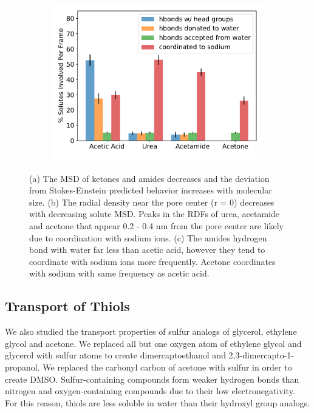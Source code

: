 \documentclass[journal=jpcbfk,manuscript=article]{achemso}
\begin{document}
\begin{figure}[!htb]
\begin{subfigure}{0.325\textwidth}
  \includegraphics[width=\textwidth]{ketone_hbonds.pdf}
  \caption{}\label{fig:ketone_hbonds}
  \end{subfigure}
  \caption{(a) The MSD of ketones and amides decreases and the deviation from
  Stokes-Einstein predicted behavior increases with molecular size.
  (b) The radial density near the pore center (r = 0) decreases with decreasing
  solute MSD. Peaks in the RDFs of urea, acetamide and acetone that appear 
  0.2 - 0.4 nm from the pore center are likely due to coordination with sodium
  ions. (c) The amides hydrogen bond with water far less than acetic acid, 
  however they tend to coordinate with sodium ions more frequently. Acetone
  coordinates with sodium with same frequency as acetic acid.}\label{fig:ketones}
  \end{figure}
  
  \subsection{Transport of Thiols}
  
  We also studied the transport properties of sulfur analogs of glycerol,
  ethylene glycol and acetone. We replaced all but one oxygen atom of 
  ethylene glycol and glycerol with sulfur atoms to create dimercaptoethanol
  and 2,3-dimercapto-1-propanol. We replaced the carbonyl carbon of acetone
  with sulfur in order to create DMSO. Sulfur-containing compounds form weaker
  hydrogen bonds than nitrogen and oxygen-containing compounds due to their
  low electronegativity.~\cite{biswal_hydrogen_2015} For this reason, thiols
  are less soluble in water than their hydroxyl group analogs.
  
\end{document}
